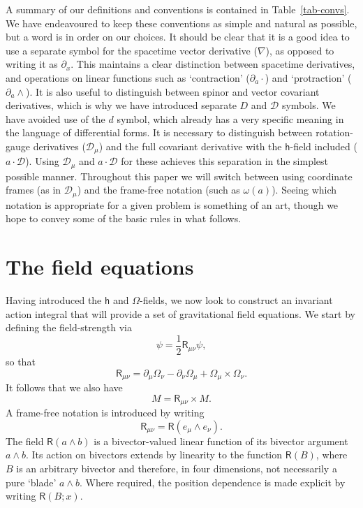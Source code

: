 \documentclass[a4paper]{article}
\numberwithin{equation}{section}
\newcommand{\dt}{\! \cdot \!}
\newcommand{\wdg}{\! \wedge \!}
\newcommand{\crs}{\! \times \!}
\newcommand{\half}{{\textstyle \frac{1}{2}}}
\newcommand{\om}{\omega}
\newcommand{\Om}{\Omega}
\newcommand{\cld}{{\mathcal{D}}}
\newcommand{\da}{\partial_a}
\newcommand{\dx}{\partial_x}
\newcommand{\dmu}{\partial_{\mu}}
\newcommand{\dnu}{\partial_{\nu}}
\newcommand{\lih}{\mathsf{h}}
\newcommand{\liR}{\mathsf{R}}
\newcommand{\grad}{\nabla}
\begin{document}
A summary of our definitions and conventions is contained in
Table~\ref{tab-convs}.  We have endeavoured to keep these conventions
as simple and natural as possible, but a word is in order on our
choices.  It should be clear that it is a good idea to use a separate
symbol for the spacetime vector derivative ($\grad$), as opposed to
writing it as $\dx$.  This maintains a clear distinction between
spacetime derivatives, and operations on linear functions such as
`contraction' ($\da\cdot$) and `protraction' ($\da\wedge$).  It is
also useful to distinguish between spinor and vector covariant
derivatives, which is why we have introduced separate $D$ and $\cld$
symbols.  We have avoided use of the $d$ symbol, which already has a
very specific meaning in the language of differential forms.  It is
necessary to distinguish between rotation-gauge derivatives
($\cld_\mu$) and the full covariant derivative with the $\lih$-field
included ($a\dt\cld$).  Using $\cld_\mu$ and $a\dt\cld$ for these
achieves this separation in the simplest possible manner.  Throughout
this paper we will switch between using coordinate frames (as in
$\cld_\mu$) and the frame-free notation (such as $\om(a)$).  Seeing
which notation is appropriate for a given problem is something of an
art, though we hope to convey some of the basic rules in what
follows. 




\section{The field equations}
\label{Field}

Having introduced the $\lih$  and $\Om$-fields, we now look to
construct an invariant action integral that will provide a set of
gravitational field equations.  We start by defining the
field-strength via
%
\begin{equation} 
[D_\mu, D_\nu] \psi = \half \liR_{\mu\nu} \psi,
\end{equation} 
%
so that
%
\begin{equation} 
\liR_{\mu\nu} = \dmu \Om_\nu - \dnu \Om_\mu + \Om_\mu \crs \Om_\nu.
\label{F1}
\end{equation} 
%
It follows that we also have 
%
\begin{equation}
[\cld_\mu, \cld_\nu] M = \liR_{\mu\nu} \crs M. 
\end{equation}
%
A frame-free notation is introduced by writing
%
\begin{equation}
\liR_{\mu\nu} = \liR(e_\mu \wdg e_\nu).
\end{equation}
%
The field $\liR(a \wedge b)$ is a bivector-valued linear function of its
bivector argument $a \wedge b$.  Its action on bivectors extends by
linearity to the function $\liR(B)$, where $B$ is an arbitrary bivector
and therefore, in four dimensions, not necessarily a pure `blade'
$a\wedge b$.  Where required, the position dependence is made explicit
by writing $\liR(B;x)$.
\end{document}
